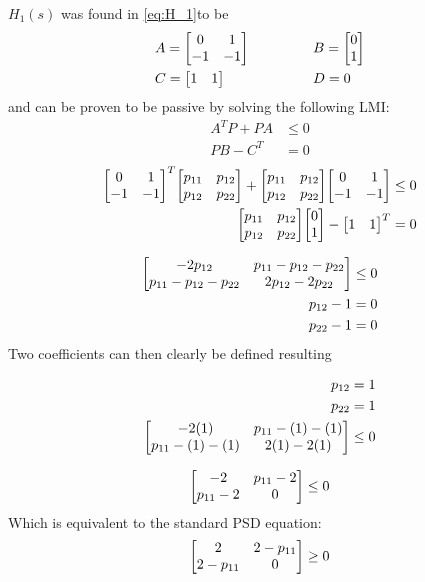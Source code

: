 \documentclass[letter]{article}
\begin{document}
\newpage
$H_1(s)$ was found in \eqref{eq:H_1}to be
\begin{equation}\nonumber
	\begin{aligned}
		&A = \mqty[0 &1\\ -1 &-1] \hspace{0.5in} &&B = \mqty[0\\ 1]\\
		&C = \mqty[1 & 1] \hspace{0.5in} &&D = 0
	\end{aligned}
\end{equation}
and can be proven to be passive by solving the following LMI:
\begin{align}
	A^T P + P A &\leq 0\\
	P B - C^T &= 0
\end{align}
\begin{align}
	\mqty[0 &1\\ -1 &-1]^T \mqty[p_{11} & p_{12}\\ p_{12} & p_{22}] + \mqty[p_{11} & p_{12}\\ p_{12} & p_{22}] \mqty[0 &1\\ -1 &-1] &\leq 0\\
	\mqty[p_{11} & p_{12}\\ p_{12} & p_{22}] \mqty[0\\ 1] - \mqty[1 & 1]^T &= 0
\end{align}

\begin{align}
	\mqty[-2p_{12} & p_{11} - p_{12} - p_{22}\\ p_{11} - p_{12} - p_{22} & 2 p_{12} - 2 p_{22}] &\leq 0\\
	p_{12} - 1 &= 0\\
	p_{22} - 1 &= 0
\end{align}
Two coefficients can then clearly be defined resulting

\begin{align}
	p_{12} &= 1\\
	p_{22} &= 1\\
	\mqty[-2(1) & p_{11} - (1) - (1)\\ p_{11} - (1) - (1) & 2 (1) - 2 (1)] &\leq 0
\end{align}

\begin{align}
	\mqty[-2 & p_{11} - 2\\ p_{11} - 2 & 0] \leq 0
\end{align}
Which is equivalent to the standard PSD equation: 
\begin{align}
	\mqty[2 & 2 - p_{11}\\ 2 - p_{11} & 0] \geq 0
\end{align}
\end{document}
